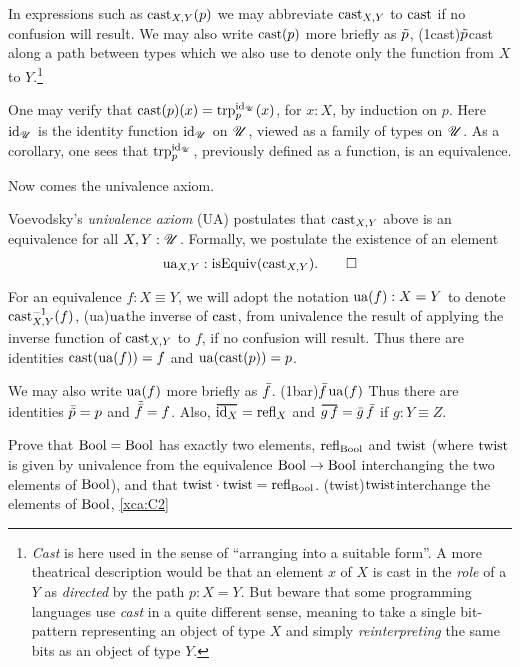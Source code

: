 In expressions such as $\cast_{X,Y}(p)$ we may abbreviate $\cast_{X,Y}$ to $\cast$ if
no confusion will result. We may also write $\cast (p)$ more briefly as $\tilde {p}$,%
\glossary(1cast){$\protect\tilde {p}$}{cast along a path between types}
which we also use to denote only the function from $X$ to $Y$.\footnote{%
    \emph{Cast} is here used in the sense of
    ``arranging into a suitable form''.
    A more theatrical description would be that
    an element $x$ of $X$ is cast in the \emph{role} of a $Y$
    as \emph{directed} by the path $p : X = Y$.
    But beware that some programming languages use \emph{cast}
    in a quite different sense, meaning to take a
    single bit-pattern representing an object of type $X$
    and simply \emph{reinterpreting} the same bits
    as an object of type $Y$.}

One may verify that $\cast(p)(x) = \trp[\id_\UU]{ p} (x)$, for $x : X$, by induction on $p$.
Here $\mathord{\mathrm{id}}_{\mathscr{U}}$ is the identity function $\mathord{\mathrm{id}}_{\mathscr{U}}$ on ${\mathscr{U}}$, viewed as a family of types on ${\mathscr{U}}$.
As a corollary, one sees that $\trp[\id_\UU]{ p}$, previously defined as a function, is an equivalence.

Now comes the univalence axiom.

\begin{principle}\label{def:univalence}
  Voevodsky's \emph{univalence axiom} (UA)%
   postulates that
$\cast_{X,Y}$ above is an equivalence for all $X,Y:{\mathscr{U}}$.
Formally, we postulate the existence of an element
\[
  \ua_{X,Y} : \isEq(\cast_{X,Y}).\qedhere
\]
\end{principle}

For an equivalence $f: X\equiv Y$, we will adopt the notation $\ua(f) : X = Y $ to denote $\cast_{X,Y}^{-1}(f)$,%
\glossary(ua){$\protect\ua$}{the inverse of $\protect\cast$, from univalence}
the result of applying the
inverse function of $\cast_{X,Y}$ to $f$, if no confusion will result.  Thus there are identities $\cast (\ua (f)) = f$ and $\ua (\cast (p)) = p$.

We may also write $\ua (f)$ more briefly as $\bar {f}$.%
\glossary(1bar){$\protect\bar {f}$}{$\protect\ua(f)$}
Thus there are identities $\bar {\tilde {p}} = p$ and $\tilde {\bar {f}} = f$. Also, $\overetop{\id_X}=\refl{X}$
and $\overetop{g\,f}=\etop{g}\,\etop{f}$ if $g: Y\equiv Z$.

\begin{xca}\label{xca:C2}
Prove that $\mathrm{Bool}=\mathrm{Bool}$ has exactly two elements,
$\mathrm{refl}_{\mathrm{Bool}}$ and $\mathrm{twist}$ (where $\mathrm{twist}$ is given by
univalence from the equivalence $\mathrm{Bool}\to\mathrm{Bool}$ interchanging
the two elements of $\mathrm{Bool}$), and that $\mathrm{twist}\cdot\mathrm{twist}=\mathrm{refl}_{\mathrm{Bool}}$.%
\glossary(twist){$\protect\mathrm{twist}$}{interchange the elements of $\mathrm{Bool}$,
  \cref{xca:C2}}
\end{xca}


